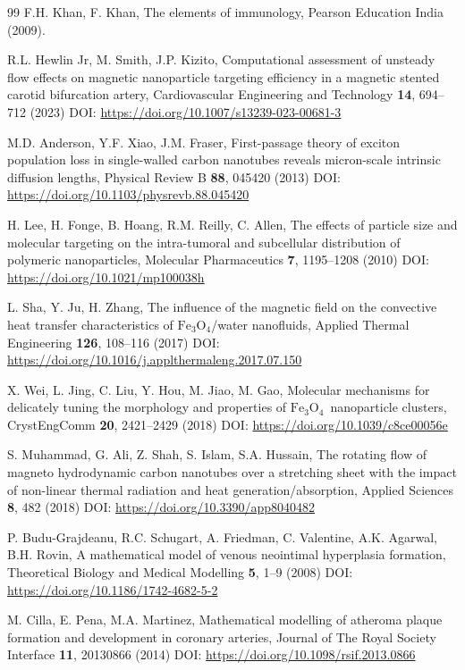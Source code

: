 \documentclass[10pt]{NSP1}
\def\feo{\ensuremath{\mathrm{Fe}_3\mathrm{O}_4}}
\begin{document}
\begin{thebibliography}{99}
		F.H. Khan, F. Khan, The elements of immunology, Pearson Education India (2009).
		
		R.L. Hewlin Jr, M. Smith, J.P. Kizito, Computational assessment of unsteady flow effects on magnetic nanoparticle targeting efficiency in a magnetic stented carotid bifurcation artery, Cardiovascular Engineering and Technology \textbf{14}, 694--712 (2023) DOI: \url{https://doi.org/10.1007/s13239-023-00681-3}
		
		M.D. Anderson, Y.F. Xiao, J.M. Fraser, First-passage theory of exciton population loss in single-walled carbon nanotubes reveals micron-scale intrinsic diffusion lengths, Physical Review B \textbf{88}, 045420 (2013) DOI: \url{https://doi.org/10.1103/physrevb.88.045420}
		
		H. Lee, H. Fonge, B. Hoang, R.M. Reilly, C. Allen, The effects of particle size and molecular targeting on the intra-tumoral and subcellular distribution of polymeric nanoparticles, Molecular Pharmaceutics \textbf{7}, 1195--1208 (2010) DOI: \url{https://doi.org/10.1021/mp100038h}
		
		L. Sha, Y. Ju, H. Zhang, The influence of the magnetic field on the convective heat transfer characteristics of \feo/water nanofluids, Applied Thermal Engineering \textbf{126}, 108--116 (2017) DOI: \url{https://doi.org/10.1016/j.applthermaleng.2017.07.150}
		
		X. Wei, L. Jing, C. Liu, Y. Hou, M. Jiao, M. Gao, Molecular mechanisms for delicately tuning the morphology and properties of \feo\ nanoparticle clusters, CrystEngComm \textbf{20}, 2421--2429 (2018) DOI: \url{https://doi.org/10.1039/c8ce00056e}
		
		S. Muhammad, G. Ali, Z. Shah, S. Islam, S.A. Hussain, The rotating flow of magneto hydrodynamic carbon nanotubes over a stretching sheet with the impact of non-linear thermal radiation and heat generation/absorption, Applied Sciences \textbf{8}, 482 (2018) DOI: \url{https://doi.org/10.3390/app8040482}
		
		P. Budu-Grajdeanu, R.C. Schugart, A. Friedman, C. Valentine, A.K. Agarwal, B.H. Rovin, A mathematical model of venous neointimal hyperplasia formation, Theoretical Biology and Medical Modelling \textbf{5}, 1--9 (2008) DOI: \url{https://doi.org/10.1186/1742-4682-5-2}
		
		M. Cilla, E. Pena, M.A. Martinez, Mathematical modelling of atheroma plaque formation and development in coronary arteries, Journal of The Royal Society Interface \textbf{11}, 20130866 (2014) DOI: \url{https://doi.org/10.1098/rsif.2013.0866}
		

\end{thebibliography}
\end{document}
